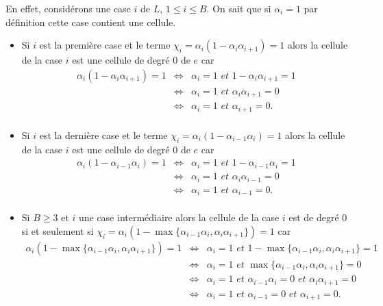 \begin{Pre}
En effet, considérons une case $i$  de $L$, $1\leq i \leq B$. On sait que si $\alpha_{i}=1$ par définition cette case contient une cellule.
\begin{itemize}
\item  Si $i$ est la première case et le terme $\chi_{i}=\alpha_{i}(1-\alpha_{i}\alpha_{i+1})=1$ alors la cellule de la case $i$ est une cellule de degré $0$ de $e$ car 
 \begin{eqnarray*}
 \alpha_{i}(1-\alpha_{i}\alpha_{i+1})=1 & \Leftrightarrow & \alpha_{i}=1 \textit{  et  }1-\alpha_{i}\alpha_{i+1}=1\\
& \Leftrightarrow & \alpha_{i}=1 \textit{  et  }\alpha_{i}\alpha_{i+1}=0\\
& \Leftrightarrow & \alpha_{i}=1 \textit{  et  }\alpha_{i+1}=0.\\ 
 \end{eqnarray*}
 \item Si $i$ est la dernière case et le terme $\chi_{i}=\alpha_{i}(1-\alpha_{i-1}\alpha_{i})=1$ alors la cellule de la case $i$ est une cellule de degré $0$ de $e$ car 
 \begin{eqnarray*}
 \alpha_{i}(1-\alpha_{i-1}\alpha_{i})=1 & \Leftrightarrow & \alpha_{i}=1 \textit{  et  }1-\alpha_{i-1}\alpha_{i}=1\\
& \Leftrightarrow & \alpha_{i}=1 \textit{  et  }\alpha_{i}\alpha_{i-1}=0\\
& \Leftrightarrow & \alpha_{i}=1 \textit{  et  }\alpha_{i-1}=0.\\ 
 \end{eqnarray*}
 \item Si $B\geq 3$ et $i$ une case intermédiaire alors la cellule de la case $i$ est de degré $0$ si et seulement si  $\chi_{i}=\alpha_{i}(1-\max\{\alpha_{i-1}\alpha_{i},\alpha_{i}\alpha_{i+1}\})=1$ car 
 \begin{eqnarray*}
 \alpha_{i}(1-\max\{\alpha_{i-1}\alpha_{i},\alpha_{i}\alpha_{i+1}\})=1 &\Leftrightarrow & \alpha_{i} = 1 \textit{  et  } 1-\max\{\alpha_{i-1}\alpha_{i},\alpha_{i}\alpha_{i+1}\}=1\\
 &\Leftrightarrow & \alpha_{i} = 1 \textit{  et  } \max\{\alpha_{i-1}\alpha_{i},\alpha_{i}\alpha_{i+1}\}=0\\
 &\Leftrightarrow & \alpha_{i} = 1 \textit{  et  } \alpha_{i-1}\alpha_{i}=0 \textit{  et  } \alpha_{i}\alpha_{i+1}=0\\
 &\Leftrightarrow & \alpha_{i} = 1 \textit{  et  } \alpha_{i-1}=0 \textit{  et  } \alpha_{i+1}=0.\\

\end{eqnarray*}
\end{itemize}
\end{Pre}
